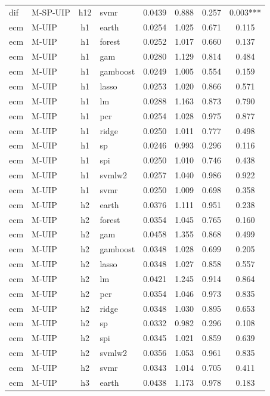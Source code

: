 \begin{ThreePartTable}
\begin{longtable}[t]{llclcccc}
dif & M-SP-UIP & h12 & svmr & 0.0439 & 0.888 & 0.257 & 0.003***\\
\addlinespace
ecm & M-UIP & h1 & earth & 0.0254 & 1.025 & 0.671 & 0.115\\
ecm & M-UIP & h1 & forest & 0.0252 & 1.017 & 0.660 & 0.137\\
ecm & M-UIP & h1 & gam & 0.0280 & 1.129 & 0.814 & 0.484\\
ecm & M-UIP & h1 & gamboost & 0.0249 & 1.005 & 0.554 & 0.159\\
ecm & M-UIP & h1 & lasso & 0.0253 & 1.020 & 0.866 & 0.571\\
ecm & M-UIP & h1 & lm & 0.0288 & 1.163 & 0.873 & 0.790\\
ecm & M-UIP & h1 & pcr & 0.0254 & 1.028 & 0.975 & 0.877\\
ecm & M-UIP & h1 & ridge & 0.0250 & 1.011 & 0.777 & 0.498\\
ecm & M-UIP & h1 & sp & 0.0246 & 0.993 & 0.296 & 0.116\\
ecm & M-UIP & h1 & spi & 0.0250 & 1.010 & 0.746 & 0.438\\
ecm & M-UIP & h1 & svmlw2 & 0.0257 & 1.040 & 0.986 & 0.922\\
ecm & M-UIP & h1 & svmr & 0.0250 & 1.009 & 0.698 & 0.358\\
\addlinespace
ecm & M-UIP & h2 & earth & 0.0376 & 1.111 & 0.951 & 0.238\\
ecm & M-UIP & h2 & forest & 0.0354 & 1.045 & 0.765 & 0.160\\
ecm & M-UIP & h2 & gam & 0.0458 & 1.355 & 0.868 & 0.499\\
ecm & M-UIP & h2 & gamboost & 0.0348 & 1.028 & 0.699 & 0.205\\
ecm & M-UIP & h2 & lasso & 0.0348 & 1.027 & 0.858 & 0.557\\
ecm & M-UIP & h2 & lm & 0.0421 & 1.245 & 0.914 & 0.864\\
ecm & M-UIP & h2 & pcr & 0.0354 & 1.046 & 0.973 & 0.835\\
ecm & M-UIP & h2 & ridge & 0.0348 & 1.030 & 0.895 & 0.653\\
ecm & M-UIP & h2 & sp & 0.0332 & 0.982 & 0.296 & 0.108\\
ecm & M-UIP & h2 & spi & 0.0345 & 1.021 & 0.859 & 0.639\\
ecm & M-UIP & h2 & svmlw2 & 0.0356 & 1.053 & 0.961 & 0.835\\
ecm & M-UIP & h2 & svmr & 0.0343 & 1.014 & 0.705 & 0.411\\
\addlinespace
ecm & M-UIP & h3 & earth & 0.0438 & 1.173 & 0.978 & 0.183\\

\end{longtable}
\end{ThreePartTable}
